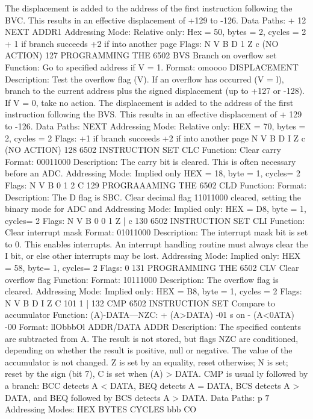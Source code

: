 The displacement is added to the address of the first instruction
following the BVC. This results in an effective displacement of
+129 to -126.
Data Paths:
+ 12
NEXT ADDR1
Addressing Mode:
Relative only:
Hex = 50, bytes = 2, cycles = 2 + 1 if branch succeeds
+2 if into another page
Flags:
N V B D 1 Z c
(NO ACTION)
127
PROGRAMMING THE 6502
BVS Branch on overflow set
Function:
Go to specified address if V = 1.
Format: omoooo DISPLACEMENT
Description:
Test the overflow flag (V). If an overflow has occurred (V = l),
branch to the current address plus the signed displacement (up to
+127 or -128). If V = 0, take no action.
The displacement is added to the address of the first instruction
following the BVS. This results in an effective displacement of
+ 129 to -126.
Data Paths:
NEXT
Addressing Mode:
Relative only:
HEX = 70, bytes = 2, cycles = 2
Flags:
+1 if branch succeeds
+2 if into another page
N V B D I Z c
(NO ACTION)
128
6502 INSTRUCTION SET
CLC
Function:
Clear carry
Format: 00011000
Description:
The carry bit is cleared. This is often necessary before an ADC.
Addressing Mode:
Implied only
HEX = 18, byte = 1, cycles= 2
Flags:
N V B 0 1 2 C
129
PROGRAAAMING THE 6502
CLD
Function:
Format:
Description:
The D flag is
SBC.
Clear decimal flag
11011000
cleared, setting the binary mode for ADC and
Addressing Mode:
Implied only:
HEX = D8, byte = 1, cycles= 2
Flags:
N V B 0
0
1 Z
|
c
130
6502 INSTRUCTION SET
CLI
Function:
Clear interrupt mask
Format: 01011000
Description:
The interrupt mask bit is set to 0. This enables interrupts. An
interrupt handling routine must always clear the I bit, or else
other interrupts may be lost.
Addressing Mode:
Implied only:
HEX = 58, byte= 1, cycles= 2
Flags:
0
131
PROGRAMMING THE 6502
CLV Clear overflow flag
Function:
Format:
10111000
Description:
The overflow flag is cleared.
Addressing Mode:
Implied only:
HEX = B8, byte = 1, cycles = 2
Flags:
N V B D I Z C
101 1 |
132
CMP
6502 INSTRUCTION SET
Compare to accumulator
Function:
(A)-DATA—NZC:
+ (A>DATA)
-01
s
on
- (A<0ATA)
-00
Format: llObbbOl ADDR/DATA ADDR
Description:
The specified contents are subtracted from A. The result is not
stored, but flags NZC are conditioned, depending on whether the
result is positive, null or negative. The value of the accumulator
is not changed. Z is set by an equality, reset otherwise; N is set;
reset by the sign (bit 7), C is set when (A) > DATA. CMP is usual
ly followed by a branch: BCC detects A < DATA, BEQ detects A
= DATA, BCS detects A > DATA, and BEQ followed by BCS
detects A > DATA.
Data Paths:
p
\v
7
Addressing Modes:
HEX
BYTES
CYCLES
bbb
CO
